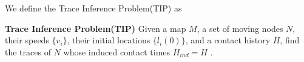 
 We define the Trace Inference Problem(TIP) as
 \begin{definition}
 \textbf{Trace Inference Problem(TIP)} Given a map $M$, a set of moving nodes $N$, their speeds $\{v_i\}$, their initial locations $\{l_i(0)\}$, and a contact history $H$,
 find the traces of $N$ whose induced contact times $H_{ind} = H$ .
 \end{definition}

